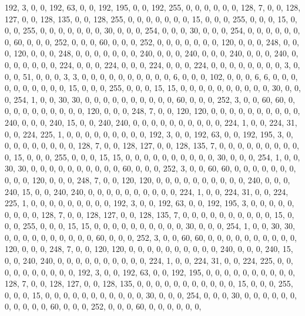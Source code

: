 \begin{DoxyCode}
       192, 3, 0, 0, 192, 63, 0, 0, 192, 195, 0, 0, 192, 255, 0, 0, 0, 0, 0, 0, 128, 7, 0, 0, 128, 127, 0, 0, 128,
       135, 0, 0, 128, 255, 0, 0, 0, 0, 0, 0, 0, 15, 0, 0, 0, 255, 0, 0, 0, 15, 0, 0, 0, 255, 0, 0, 0, 0, 0, 0, 0,
       30, 0, 0, 0, 254, 0, 0, 0, 30, 0, 0, 0, 254, 0, 0, 0, 0, 0, 0, 0, 60, 0, 0, 0, 252, 0, 0, 0, 60, 0, 0, 0,
       252, 0, 0, 0, 0, 0, 0, 0, 120, 0, 0, 0, 248, 0, 0, 0, 120, 0, 0, 0, 248, 0, 0, 0, 0, 0, 0, 0, 240, 0, 0, 0,
       240, 0, 0, 0, 240, 0, 0, 0, 240, 0, 0, 0, 0, 0, 0, 0, 224, 0, 0, 0, 224, 0, 0, 0, 224, 0, 0, 0, 224, 0, 0, 0,
       0, 0, 0, 0, 0, 3, 0, 0, 0, 51, 0, 0, 0, 3, 3, 0, 0, 0, 0, 0, 0, 0, 0, 0, 0, 6, 0, 0, 0, 102, 0, 0, 0, 6, 6,
       0, 0, 0, 0, 0, 0, 0, 0, 0, 0, 15, 0, 0, 0, 255, 0, 0, 0, 15, 15, 0, 0, 0, 0, 0, 0, 0, 0, 0, 0, 30, 0, 0, 0,
       254, 1, 0, 0, 30, 30, 0, 0, 0, 0, 0, 0, 0, 0, 0, 0, 60, 0, 0, 0, 252, 3, 0, 0, 60, 60, 0, 0, 0, 0, 0, 0, 0,
       0, 0, 0, 120, 0, 0, 0, 248, 7, 0, 0, 120, 120, 0, 0, 0, 0, 0, 0, 0, 0, 0, 0, 240, 0, 0, 0, 240, 15, 0, 0,
       240, 240, 0, 0, 0, 0, 0, 0, 0, 0, 0, 0, 224, 1, 0, 0, 224, 31, 0, 0, 224, 225, 1, 0, 0, 0, 0, 0, 0, 0, 0, 0,
       192, 3, 0, 0, 192, 63, 0, 0, 192, 195, 3, 0, 0, 0, 0, 0, 0, 0, 0, 0, 128, 7, 0, 0, 128, 127, 0, 0, 128, 135,
       7, 0, 0, 0, 0, 0, 0, 0, 0, 0, 0, 15, 0, 0, 0, 255, 0, 0, 0, 15, 15, 0, 0, 0, 0, 0, 0, 0, 0, 0, 0, 30, 0, 0,
       0, 254, 1, 0, 0, 30, 30, 0, 0, 0, 0, 0, 0, 0, 0, 0, 0, 60, 0, 0, 0, 252, 3, 0, 0, 60, 60, 0, 0, 0, 0, 0, 0,
       0, 0, 0, 0, 120, 0, 0, 0, 248, 7, 0, 0, 120, 120, 0, 0, 0, 0, 0, 0, 0, 0, 0, 0, 240, 0, 0, 0, 240, 15, 0, 0,
       240, 240, 0, 0, 0, 0, 0, 0, 0, 0, 0, 0, 224, 1, 0, 0, 224, 31, 0, 0, 224, 225, 1, 0, 0, 0, 0, 0, 0, 0, 0, 0,
       192, 3, 0, 0, 192, 63, 0, 0, 192, 195, 3, 0, 0, 0, 0, 0, 0, 0, 0, 0, 128, 7, 0, 0, 128, 127, 0, 0, 128,
       135, 7, 0, 0, 0, 0, 0, 0, 0, 0, 0, 0, 15, 0, 0, 0, 255, 0, 0, 0, 15, 15, 0, 0, 0, 0, 0, 0, 0, 0, 0, 0, 30, 0,
       0, 0, 254, 1, 0, 0, 30, 30, 0, 0, 0, 0, 0, 0, 0, 0, 0, 0, 60, 0, 0, 0, 252, 3, 0, 0, 60, 60, 0, 0, 0, 0, 0,
       0, 0, 0, 0, 0, 120, 0, 0, 0, 248, 7, 0, 0, 120, 120, 0, 0, 0, 0, 0, 0, 0, 0, 0, 0, 240, 0, 0, 0, 240, 15, 0,
       0, 240, 240, 0, 0, 0, 0, 0, 0, 0, 0, 0, 0, 224, 1, 0, 0, 224, 31, 0, 0, 224, 225, 0, 0, 0, 0, 0, 0, 0, 0, 0,
       0, 192, 3, 0, 0, 192, 63, 0, 0, 192, 195, 0, 0, 0, 0, 0, 0, 0, 0, 0, 0, 128, 7, 0, 0, 128, 127, 0, 0, 128,
       135, 0, 0, 0, 0, 0, 0, 0, 0, 0, 0, 0, 15, 0, 0, 0, 255, 0, 0, 0, 15, 0, 0, 0, 0, 0, 0, 0, 0, 0, 0, 0, 30, 0,
       0, 0, 254, 0, 0, 0, 30, 0, 0, 0, 0, 0, 0, 0, 0, 0, 0, 0, 60, 0, 0, 0, 252, 0, 0, 0, 60, 0, 0, 0, 0, 0, 0,

\end{DoxyCode}
